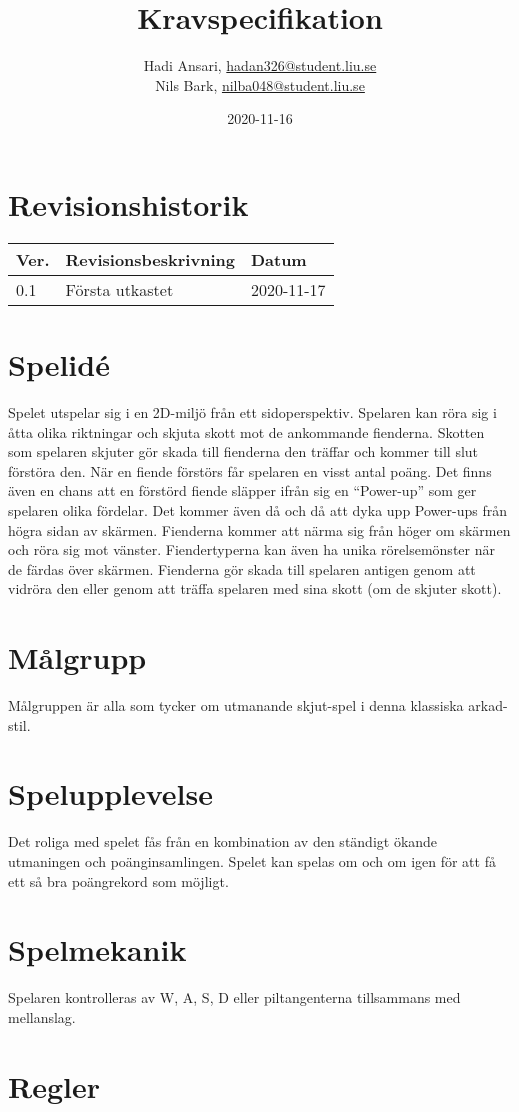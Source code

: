 \documentclass{TDP005mall}
\author{Hadi Ansari, \url{hadan326@student.liu.se}\\
  Nils Bark, \url{nilba048@student.liu.se}}
\title{Kravspecifikation}
\date{2020-11-16}
\begin{document}
\projectpage
\section{Revisionshistorik}
\begin{table}[!h]
\begin{tabularx}{\linewidth}{|l|X|l|}
\hline
Ver. & Revisionsbeskrivning & Datum \\\hline
0.1 & Första utkastet & 2020-11-17 \\\hline

\end{tabularx}
\end{table}


\section{Spelidé}
Spelet utspelar sig i en 2D-miljö från ett sidoperspektiv. Spelaren kan röra sig i åtta olika riktningar och skjuta skott mot de ankommande fienderna. Skotten som spelaren skjuter gör skada till fienderna den träffar och kommer till slut förstöra den. När en fiende förstörs får spelaren en visst antal poäng. Det finns även en chans att en förstörd fiende släpper ifrån sig en ``Power-up'' som ger spelaren olika fördelar. Det kommer även då och då att dyka upp Power-ups från högra sidan av skärmen. Fienderna kommer att närma sig från höger om skärmen och röra sig mot vänster. Fiendertyperna kan även ha unika rörelsemönster när de färdas över skärmen. Fienderna gör skada till spelaren antigen genom att vidröra den eller genom att träffa spelaren med sina skott (om de skjuter skott).

\section{Målgrupp}
Målgruppen är alla som tycker om utmanande skjut-spel i denna klassiska arkad-stil.

\section{Spelupplevelse}
Det roliga med spelet fås från en kombination av den ständigt ökande utmaningen och poänginsamlingen. Spelet kan spelas om och om igen för att få ett så bra poängrekord som möjligt.

\section{Spelmekanik}
Spelaren kontrolleras av W, A, S, D eller piltangenterna tillsammans med mellanslag.

\section{Regler}
\end{document}
